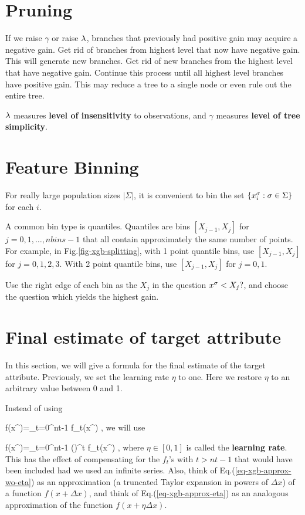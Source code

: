 \section{Pruning}
If we raise $\gamma$
or raise $\lambda$,  branches
that previously had positive gain
may acquire a negative gain.
Get rid 
of branches
from highest level that now have negative gain.
This will generate new branches.
Get rid of new branches
from the highest level that have
negative gain. Continue
this process until all
highest level branches have 
positive gain.
This may reduce a tree
to a single node
or even rule out the entire
tree.

$\lambda$ measures {\bf level of insensitivity}
to observations, and $\gamma$ measures
{\bf level of tree simplicity}.



\section{Feature Binning}

For really large population sizes $|\Sigma|$, 
it is convenient to bin the 
set $\{x^\sigma_i:\sigma\in \Sigma\}$
for each $i$. 

A common
bin type is quantiles. 
Quantiles are bins $[X_{j-1}, X_j]$
 for $j=0, 1, 
\ldots, nbins-1$ that 
all contain approximately
the same number of points.
For example, 
in Fig.\ref{fig-xgb-splitting},
with 1 point quantile bins,
use $[X_{j-1}, X_j]$ for $j=0,1,2,3$.
With 2 point quantile bins,
use $[X_{j-1}, X_j]$ for $j=0,1$.

Use the right edge 
of each bin as the $X_j$ in the question 
 $x^\sigma<X_j?$,
and choose the question which
yields the highest gain.


 


\section{Final estimate of
target attribute}

In this section,
we will
give a formula for the 
final estimate
of the target attribute.
Previously, we set
the learning rate $\eta$ to one.
Here we restore $\eta$
to an arbitrary value 
between 0 and 1.

Instead of using 

\beq
f(x^\s)=\sum_{t=0}^{nt-1} f_t(x^\s)
\;,
\label{eq-xgb-approx-wo-eta}
\eeq
we will use 

\beq
f(x^\s)=\sum_{t=0}^{nt-1} 
 (\eta)^t f_t(x^\s)
\;,
\label{eq-xgb-approx-eta}
\eeq
where $\eta\in [0,1]$ is called 
the {\bf learning rate}.
This has the effect
of compensating for the $f_t$'s
with $t>nt-1$ that would
 have been included
had we used an infinite series.
Also, think of Eq.(\ref{eq-xgb-approx-wo-eta})
as
an approximation  (a truncated Taylor
expansion in powers
of $\Delta x$) of a function $f(x+\Delta x)$,
and think of Eq.(\ref{eq-xgb-approx-eta})
as an analogous approximation of the function 
$f(x+\eta \Delta x)$.

